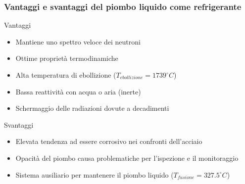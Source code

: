  
 \begin{frame}
 \frametitle{Vantaggi e svantaggi del piombo liquido come refrigerante}
 \vspace{0.5cm}
 \begin{block}{Vantaggi}
 \begin{itemize}
 \item[\checkmark] Mantiene uno spettro veloce dei neutroni
 \item[\checkmark] Ottime proprietà termodinamiche
 \item[\checkmark] Alta temperatura di ebollizione ($T_{ebollizione}=1739 ^\circ C$)
 \item[\checkmark] Bassa reattività con acqua o aria (inerte)
 \item[\checkmark] Schermaggio delle radiazioni dovute a decadimenti
 \end{itemize}
 \end{block}
 
 
 \begin{block}{Svantaggi}
 \begin{itemize}
 \item[\textbf{$\times$}] Elevata tendenza ad essere corrosivo nei confronti dell'acciaio
 \item[\textbf{$\times$}] Opacità del piombo causa problematiche per l'ispezione e il monitoraggio
 \item[\textbf{$\times$}] Sistema ausiliario per mantenere il piombo liquido ($T_{fusione}=327.5 ^\circ C$)
 \end{itemize}
 \end{block}
 \end{frame}
 
